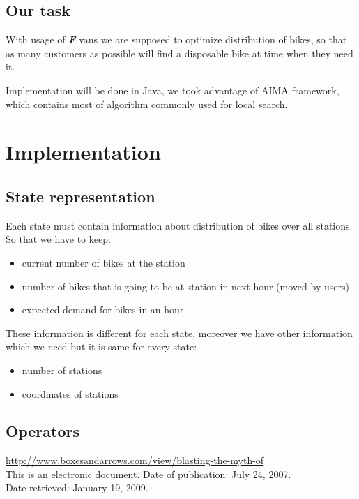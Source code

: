 \documentclass[a4paper,10pt]{report}
\begin{document}
\section{Our task}
With usage of \textbf{\textsl{F}} vans we are supposed to optimize distribution of bikes, so that as many customers as possible will find a disposable bike at time when they need it.

Implementation will be done in Java, we took advantage of AIMA framework, which contains most of algorithm commonly used for local search.

\chapter{Implementation}
\section{State representation} 
Each state must contain information about distribution of bikes over all stations. So that we have to keep:
\begin{itemize}
\item current number of bikes at the station
\item number of bikes that is going to be at station in next hour (moved by users)
\item expected demand for bikes in an hour
\end{itemize}
These information is different for each state, moreover we have other information which we need but it is same for every state:
\begin{itemize}
 \item number of stations
 \item coordinates of stations
\end{itemize}


\section{Operators}


\clearpage
\begin{thebibliography}{9}
		\url{http://www.boxesandarrows.com/view/blasting-the-myth-of} \\
		{This is an electronic document. Date of publication: July 24, 2007. \\
		Date retrieved: January 19, 2009. }


\end{thebibliography}
\end{document}
